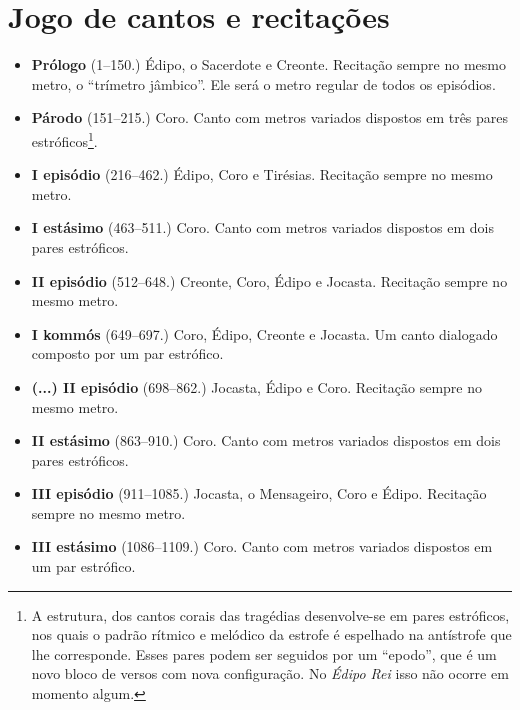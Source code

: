 \section{Jogo de cantos e recitações}

\begin{itemize}
\item \textbf{Prólogo} (1--150.)  
 {Édipo, o Sacerdote e Creonte}. Recitação sempre no mesmo metro, o ``trímetro jâmbico''. Ele será o metro regular de todos os episódios. 

\item \textbf{Párodo} (151--215.)
 {Coro}. Canto com metros variados dispostos em três pares estróficos\footnote{ A estrutura, dos cantos corais das tragédias desenvolve-se em pares estróficos, nos quais o padrão rítmico e melódico da estrofe é espelhado na antístrofe que lhe corresponde. Esses pares podem ser seguidos por um ``epodo'', que é um novo bloco de versos com nova configuração. No \emph{Édipo Rei} isso não ocorre em momento algum.}. 

\item \textbf{I episódio} (216--462.)        
	 {Édipo, Coro e Tirésias}. Recitação sempre no mesmo metro. 

\item \textbf{I estásimo} (463--511.)     
	 {Coro}. Canto com metros variados dispostos em dois pares estróficos. 

\item \textbf{II episódio} (512--648.)         
	 {Creonte, Coro, Édipo e Jocasta}. Recitação sempre no mesmo metro.  

\item \textbf{I kommós} (649--697.)   
	 {Coro, Édipo, Creonte e Jocasta}. Um canto dialogado composto por um par estrófico. 

\item \textbf{(...) II episódio} (698--862.)
	 {Jocasta, Édipo e Coro}. Recitação sempre no mesmo metro. 

\item \textbf{II estásimo} (863--910.)         
	 {Coro}. Canto com metros variados dispostos em dois pares estróficos. 

\item \textbf{III episódio} (911--1085.)       
	 {Jocasta, o Mensageiro, Coro e Édipo}. Recitação sempre no mesmo metro. 

\item \textbf{III estásimo} (1086--1109.)      
	 {Coro}. Canto com metros variados dispostos em um par estrófico. 


\end{itemize}
